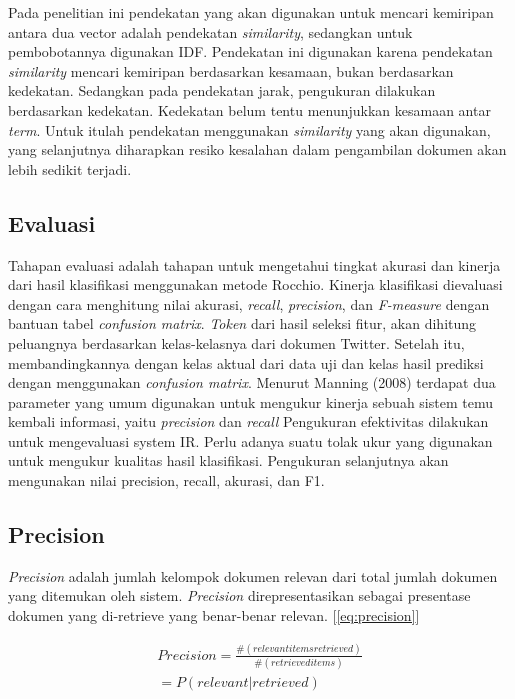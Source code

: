 Pada penelitian ini pendekatan yang akan digunakan untuk mencari kemiripan antara dua vector adalah pendekatan \textit{similarity}, sedangkan untuk pembobotannya digunakan IDF. Pendekatan ini digunakan karena pendekatan \textit{similarity} mencari kemiripan berdasarkan kesamaan, bukan berdasarkan kedekatan. Sedangkan pada pendekatan jarak, pengukuran dilakukan berdasarkan kedekatan. Kedekatan belum tentu menunjukkan kesamaan antar \textit{term}. Untuk itulah pendekatan menggunakan \textit{similarity} yang akan digunakan, yang selanjutnya diharapkan resiko kesalahan dalam pengambilan dokumen akan lebih sedikit terjadi.

\subsection*{Evaluasi}
Tahapan evaluasi adalah tahapan untuk mengetahui tingkat akurasi dan kinerja dari hasil klasifikasi menggunakan metode Rocchio. Kinerja klasifikasi dievaluasi dengan cara menghitung nilai akurasi, \textit{recall}, \textit{precision}, dan \textit{F-measure} dengan bantuan tabel \textit{confusion matrix}. \textit{Token} dari hasil seleksi fitur, akan dihitung peluangnya berdasarkan kelas-kelasnya dari dokumen Twitter. Setelah itu, membandingkannya dengan kelas aktual dari data uji dan kelas hasil prediksi dengan menggunakan \textit{confusion matrix}.
Menurut Manning (2008) terdapat dua parameter yang umum digunakan untuk mengukur kinerja sebuah sistem temu kembali informasi, yaitu \textit{precision} dan \textit{recall} Pengukuran efektivitas dilakukan untuk mengevaluasi system IR. Perlu adanya suatu tolak ukur yang digunakan untuk mengukur kualitas hasil klasifikasi. Pengukuran selanjutnya akan mengunakan nilai precision, recall, akurasi, dan F1. 

\subsection*{Precision}
\textit{Precision} adalah jumlah kelompok dokumen relevan dari total jumlah dokumen yang  ditemukan oleh sistem. \textit{Precision} direpresentasikan sebagai presentase dokumen yang di-retrieve yang benar-benar relevan. [\ref{eq:precision}]

\begin{equation}
\begin{split}
Precision = \frac{\#(relevant items retrieved)}{\#(retrieved items)} \\ 
= P(relevant|retrieved)
\label{eq:precision}
\end{split}
\end{equation}

